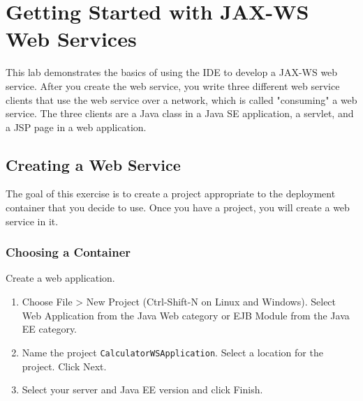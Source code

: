 \section{Getting Started with JAX-WS Web Services}
This lab demonstrates the basics of using the IDE to develop a JAX-WS web service. After you create the web service, you write three different web service clients that use the web service over a network, which is called "consuming" a web service. The three clients are a Java class in a Java SE application, a servlet, and a JSP page in a web application. 
\subsection{Creating a Web Service}
The goal of this exercise is to create a project appropriate to the deployment container that you decide to use. Once you have a project, you will create a web service in it.
\subsubsection{Choosing a Container}
Create a web application.
\begin{enumerate}
\item Choose File > New Project (Ctrl-Shift-N on Linux and Windows). Select Web Application from the Java Web category or EJB Module from the Java EE category.
\item Name the project \texttt{CalculatorWSApplication}. Select a location for the project. Click Next. 
\item Select your server and Java EE version and click Finish.
\end{enumerate}
